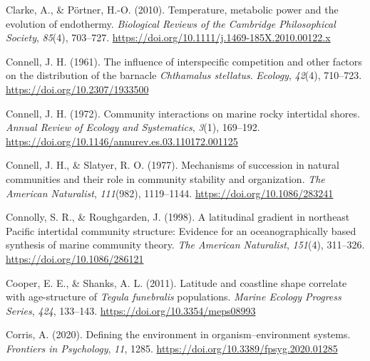 \documentclass{CSUNthesis}
\begin{document}
Clarke, A., \& Pörtner, H.-O. (2010). Temperature, metabolic power and the evolution of endothermy. \textit{Biological Reviews of the Cambridge Philosophical Society}, \textit{85}(4), 703--727. \url{https://doi.org/10.1111/j.1469-185X.2010.00122.x}

\vspace{0.1em}

Connell, J. H. (1961). The influence of interspecific competition and other factors on the distribution of the barnacle \textit{Chthamalus stellatus}. \textit{Ecology}, \textit{42}(4), 710--723. \url{https://doi.org/10.2307/1933500}

\vspace{0.1em}

Connell, J. H. (1972). Community interactions on marine rocky intertidal shores. \textit{Annual Review of Ecology and Systematics}, \textit{3}(1), 169--192. \url{https://doi.org/10.1146/annurev.es.03.110172.001125}

\vspace{0.1em}

Connell, J. H., \& Slatyer, R. O. (1977). Mechanisms of succession in natural communities and their role in community stability and organization. \textit{The American Naturalist}, \textit{111}(982), 1119--1144. \url{https://doi.org/10.1086/283241}

\vspace{0.1em}

Connolly, S. R., \& Roughgarden, J. (1998). A latitudinal gradient in northeast Pacific intertidal community structure: Evidence for an oceanographically based synthesis of marine community theory. \textit{The American Naturalist}, \textit{151}(4), 311--326. \url{https://doi.org/10.1086/286121}

\vspace{0.1em}

Cooper, E. E., \& Shanks, A. L. (2011). Latitude and coastline shape correlate with age-structure of \textit{Tegula funebralis} populations. \textit{Marine Ecology Progress Series}, \textit{424}, 133--143. \url{https://doi.org/10.3354/meps08993}

\vspace{0.1em}

Corris, A. (2020). Defining the environment in organism--environment systems. \textit{Frontiers in Psychology}, \textit{11}, 1285. \url{https://doi.org/10.3389/fpsyg.2020.01285}

\vspace{0.1em}
\end{document}
